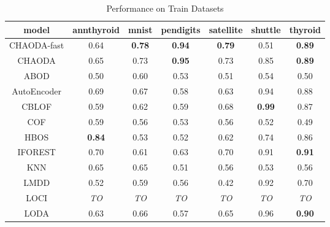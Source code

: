 \begin{table*}[!t]
\renewcommand{\arraystretch}{1.25}
\caption{Performance on Train Datasets}
\label{table:results:train-performance}
\centering
\begin{tabular}{|c|c|c|c|c|c|c|}
\hline
\textbf{model} & \textbf{annthyroid} & \textbf{mnist} & \textbf{pendigits} & \textbf{satellite} & \textbf{shuttle} & \textbf{thyroid} \\
\hline
        CHAODA-fast &                0.64 &  \textbf{0.78} &      \textbf{0.94} &      \textbf{0.79} &             0.51 &    \textbf{0.89} \\
\hline
        CHAODA &                0.65 &           0.73 &      \textbf{0.95} &               0.73 &             0.85 &    \textbf{0.89} \\
\hline
                ABOD &                0.50 &           0.60 &               0.53 &               0.51 &             0.54 &             0.50 \\
\hline
        AutoEncoder &                0.69 &           0.67 &               0.58 &               0.63 &             0.94 &             0.88 \\
\hline
                CBLOF &                0.59 &           0.62 &               0.59 &               0.68 &    \textbf{0.99} &             0.87 \\
\hline
                COF &                0.59 &           0.56 &               0.53 &               0.56 &             0.52 &             0.49 \\
\hline
                HBOS &       \textbf{0.84} &           0.53 &               0.52 &               0.62 &             0.74 &             0.86 \\
\hline
        IFOREST &                0.70 &           0.61 &               0.63 &               0.70 &             0.91 &    \textbf{0.91} \\
\hline
                KNN &                0.65 &           0.65 &               0.51 &               0.56 &             0.53 &             0.56 \\
\hline
                LMDD &                0.52 &           0.59 &               0.56 &               0.42 &             0.92 &             0.70 \\
\hline
                LOCI &         \textit{TO} &    \textit{TO} &        \textit{TO} &        \textit{TO} &      \textit{TO} &      \textit{TO} \\
\hline
                LODA &                0.63 &           0.66 &               0.57 &               0.65 &             0.96 &    \textbf{0.90} \\

\end{tabular}
\end{table*}
